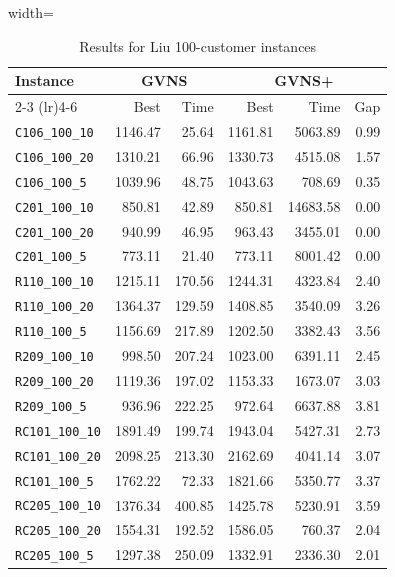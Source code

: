 ﻿\documentclass{article}
\begin{document}
\begin{table}[ht]
\centering
\small
\setlength{\tabcolsep}{3pt}
\caption{Results for Liu 100-customer instances}
\vspace{4mm}
\begin{adjustbox}{width=\textwidth}
\begin{tabular}{l r r @{\hspace{4pt}} r r r}
\toprule
\multirow{2}{*}{Instance} & \multicolumn{2}{c}{GVNS} & \multicolumn{3}{c}{GVNS+} \\
\cmidrule(lr){2-3} \cmidrule(lr){4-6}
 & Best & Time & Best & Time & Gap \\
\midrule
\texttt{C106\_100\_10} & 1146.47 & 25.64 & 1161.81 & 5063.89 & 0.99 \\
\texttt{C106\_100\_20} & 1310.21 & 66.96 & 1330.73 & 4515.08 & 1.57 \\
\texttt{C106\_100\_5} & 1039.96 & 48.75 & 1043.63 & 708.69 & 0.35 \\
\texttt{C201\_100\_10} & 850.81 & 42.89 & 850.81 & 14683.58 & 0.00 \\
\texttt{C201\_100\_20} & 940.99 & 46.95 & 963.43 & 3455.01 & 0.00 \\
\texttt{C201\_100\_5} & 773.11 & 21.40 & 773.11 & 8001.42 & 0.00 \\
\texttt{R110\_100\_10} & 1215.11 & 170.56 & 1244.31 & 4323.84 & 2.40 \\
\texttt{R110\_100\_20} & 1364.37 & 129.59 & 1408.85 & 3540.09 & 3.26 \\
\texttt{R110\_100\_5} & 1156.69 & 217.89 & 1202.50 & 3382.43 & 3.56 \\
\texttt{R209\_100\_10} & 998.50 & 207.24 & 1023.00 & 6391.11 & 2.45 \\
\texttt{R209\_100\_20} & 1119.36 & 197.02 & 1153.33 & 1673.07 & 3.03 \\
\texttt{R209\_100\_5} & 936.96 & 222.25 & 972.64 & 6637.88 & 3.81 \\
\texttt{RC101\_100\_10} & 1891.49 & 199.74 & 1943.04 & 5427.31 & 2.73 \\
\texttt{RC101\_100\_20} & 2098.25 & 213.30 & 2162.69 & 4041.14 & 3.07 \\
\texttt{RC101\_100\_5} & 1762.22 & 72.33 & 1821.66 & 5350.77 & 3.37 \\
\texttt{RC205\_100\_10} & 1376.34 & 400.85 & 1425.78 & 5230.91 & 3.59 \\
\texttt{RC205\_100\_20} & 1554.31 & 192.52 & 1586.05 & 760.37 & 2.04 \\
\texttt{RC205\_100\_5} & 1297.38 & 250.09 & 1332.91 & 2336.30 & 2.01 \\
\bottomrule
\end{tabular}
\end{adjustbox}
\end{table}
\end{document}
